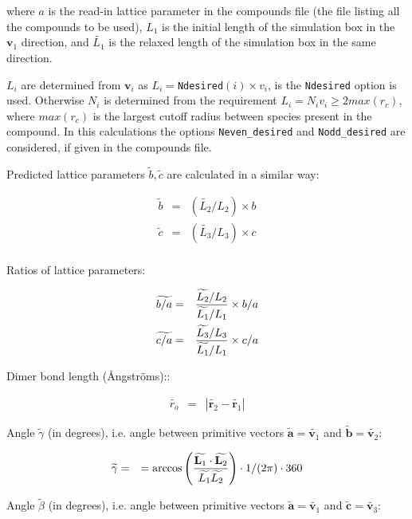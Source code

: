 \documentclass[a4paper,12pt,pdftex,onecolumn]{article}
\begin{document}
where $a$ is the read-in lattice parameter in the compounds file
(the file listing all the compounds to be used),
$L_1$ is the initial length of the simulation box in the $\mathbf{v}_1$ direction, and
$\widetilde{L_1}$ is the relaxed length of the simulation box in the same direction.


$L_i$ are determined from $\mathbf{v}_i$ as $L_i = $\verb+Ndesired+$(i) \times v_i$,
is the \verb+Ndesired+ option is used. Otherwise $N_i$ is determined from the requirement
$L_i = N_i v_i \ge 2 max(r_c)$, where $max(r_c)$ is the largest cutoff radius between
species present in the compound. In this calculations the options \verb+Neven_desired+ and
\verb+Nodd_desired+ are considered, if given in the compounds file.

Predicted lattice parameters $\widetilde{b}, \widetilde{c}$ are calculated
in a similar way:

\begin{eqnarray}
\widetilde{b} &=& (\widetilde{L_2} / L_2) \times b \\
\widetilde{c} &=& (\widetilde{L_3} / L_3) \times c \\
\end{eqnarray}

Ratios of lattice parameters:

\begin{eqnarray}
\widetilde{b/a} &=& { \widetilde{L_2}/L_2 \over \widetilde{L_1}/L_1 } \times b/a \\
\widetilde{c/a} &=& { \widetilde{L_3}/L_3 \over \widetilde{L_1}/L_1 } \times c/a
\end{eqnarray}

Dimer bond length (\AA{}ngstr\"oms)::

\begin{eqnarray}
\widetilde{r_o} &=& | \widetilde{\mathbf{r}_2} - \widetilde{\mathbf{r}_1} |
\end{eqnarray}

Angle $\widetilde{\gamma}$ (in degrees), i.e.
angle between primitive vectors
$\widetilde{\mathbf{a}} = \widetilde{\mathbf{v}_1}$ and
$\widetilde{\mathbf{b}} = \widetilde{\mathbf{v}_2}$:

\begin{eqnarray}
\widetilde{\gamma} &=&
= \arccos \left(
{ \widetilde{\mathbf{L}_1} \cdot \widetilde{\mathbf{L}_2} \over \widetilde{L_1} \widetilde{L_2} }
\right) \cdot 1/(2 \pi) \cdot 360
\end{eqnarray}

Angle $\widetilde{\beta}$ (in degrees), i.e.
angle between primitive vectors
$\widetilde{\mathbf{a}} = \widetilde{\mathbf{v}_1}$ and
$\widetilde{\mathbf{c}} = \widetilde{\mathbf{v}_3}$:
\end{document}
